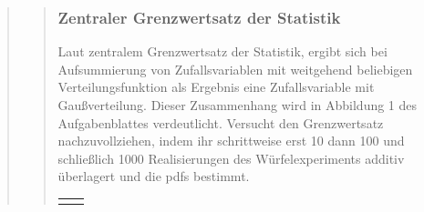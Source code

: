 \begin{quote}
\begin{quote}
\begin{quote}
        \end{quote}
        
        
        
        \subsubsection{Zentraler Grenzwertsatz der Statistik}
        Laut zentralem Grenzwertsatz der Statistik, ergibt sich bei Aufsummierung von Zufallsvariablen mit
        weitgehend beliebigen Verteilungsfunktion als Ergebnis eine Zufallsvariable mit Gaußverteilung.
        Dieser Zusammenhang wird in Abbildung 1 des Aufgabenblattes verdeutlicht. Versucht den Grenzwertsatz nachzuvollziehen,
        indem ihr schrittweise erst 10 dann 100 und schließlich 1000 Realisierungen des Würfelexperiments additiv überlagert und die pdfs bestimmt.
        
        
        \begin{center}
        \begin{tabular}{ll}
        
        \hspace{-5cm}
            \begin{minipage}{0.6\textwidth}
                

\end{minipage}
\end{tabular}
\end{center}
\end{quote}
\end{quote}
